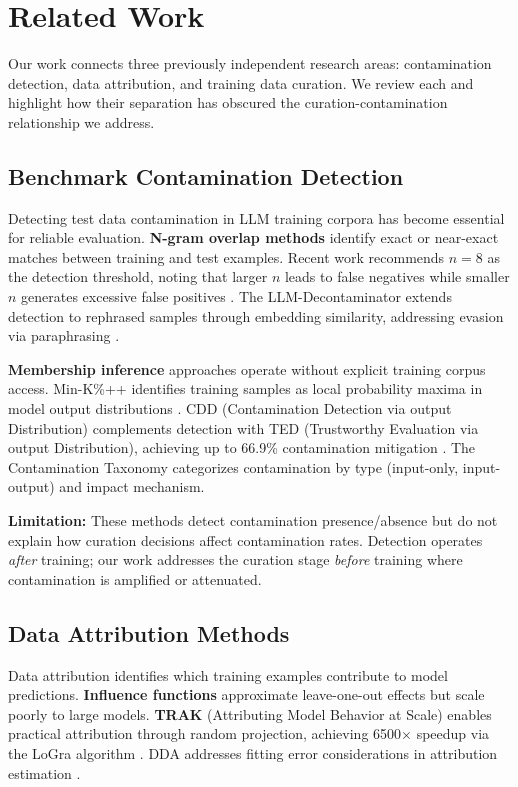 \section{Related Work}

Our work connects three previously independent research areas: contamination detection, data attribution, and training data curation. We review each and highlight how their separation has obscured the curation-contamination relationship we address.

\subsection{Benchmark Contamination Detection}

Detecting test data contamination in LLM training corpora has become essential for reliable evaluation. \textbf{N-gram overlap methods} identify exact or near-exact matches between training and test examples. Recent work recommends $n=8$ as the detection threshold, noting that larger $n$ leads to false negatives while smaller $n$ generates excessive false positives \citep{contam2024}. The LLM-Decontaminator extends detection to rephrased samples through embedding similarity, addressing evasion via paraphrasing \citep{shi2023rethinking}.

\textbf{Membership inference} approaches operate without explicit training corpus access. Min-K\%++ identifies training samples as local probability maxima in model output distributions \citep{zhang2024minkpp}. CDD (Contamination Detection via output Distribution) complements detection with TED (Trustworthy Evaluation via output Distribution), achieving up to 66.9\% contamination mitigation \citep{dong2024cdd}. The Contamination Taxonomy \citep{palavalli2024taxonomy} categorizes contamination by type (input-only, input-output) and impact mechanism.

\textbf{Limitation:} These methods detect contamination presence/absence but do not explain how curation decisions affect contamination rates. Detection operates \textit{after} training; our work addresses the curation stage \textit{before} training where contamination is amplified or attenuated.

\subsection{Data Attribution Methods}

Data attribution identifies which training examples contribute to model predictions. \textbf{Influence functions} \citep{koh2017influence} approximate leave-one-out effects but scale poorly to large models. \textbf{TRAK} (Attributing Model Behavior at Scale) \citep{park2023trak} enables practical attribution through random projection, achieving 6500$\times$ speedup via the LoGra algorithm \citep{choe2024logra}. DDA addresses fitting error considerations in attribution estimation \citep{wu2024dda}.


